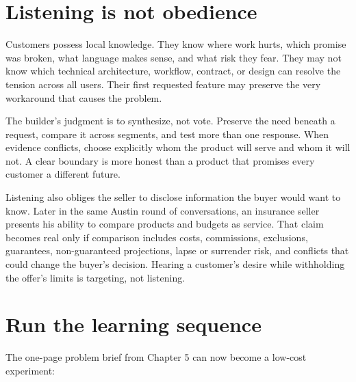 \section{Listening is not obedience}

Customers possess local knowledge. They know where work hurts, which promise
was broken, what language makes sense, and what risk they fear. They may not
know which technical architecture, workflow, contract, or design can resolve
the tension across all users. Their first requested feature may preserve the
very workaround that causes the problem.

The builder's judgment is to synthesize, not vote. Preserve the need beneath a
request, compare it across segments, and test more than one response. When
evidence conflicts, choose explicitly whom the product will serve and whom it
will not. A clear boundary is more honest than a product that promises every
customer a different future.

Listening also obliges the seller to disclose information the buyer would want
to know. Later in the same Austin round of conversations, an insurance seller
presents his ability to compare products and budgets as service. That claim
becomes real only if comparison includes costs, commissions, exclusions,
guarantees, non-guaranteed projections, lapse or surrender risk, and conflicts
that could change the buyer's decision. Hearing a customer's desire while
withholding the offer's limits is targeting, not listening.

\section{Run the learning sequence}

The one-page problem brief from Chapter 5 can now become a low-cost experiment:

